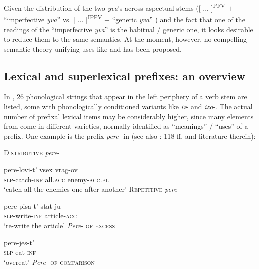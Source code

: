 \documentclass[output=paper,colorlinks,citecolor=brown]{langscibook}
\begin{document}

Given the distribution of the two \textit{yva}’s across aspectual stems ([ ... ]\textsuperscript{PFV} $+$ “imperfective \textit{yva}” vs. [ ... ]\textsuperscript{IPFV} $+$ “generic \textit{yva}” ) and the fact that one of the readings of the  “imperfective \textit{yva}” is the habitual / generic one, it looks desirable to reduce them to the same semantics. 
At the moment, however, no compelling semantic theory unifying uses like  and  has been proposed. 

\subsection{Lexical and superlexical prefixes: an overview}\label{sec:1.3}
\hypertarget{RefHeadingToc164647619}{}
In , 26 phonological strings that appear in the left periphery of a verb stem are listed, some with phonologically conditioned variants like \textit{iz}- and \textit{izo}-. The actual number of prefixal lexical items may be considerably higher, since many elements from  come in different varieties, normally identified as “meanings” / “uses” of a prefix. One example is the prefix \textit{pere-} in  (see also \citealt{Kagan15}: 118 ff. and literature therein):

\ea\label{tat:ex:17}
\ea     \textsc{Distributive} \textit{pere}-

\gll    pere-lovi-t’  vsex  vrag-ov  \\
    \textsc{slp}-catch-\textsc{inf}  all.\textsc{acc}  enemy-\textsc{acc.pl}\\
\glt    ‘catch all the enemies one after another’\label{ex:tatevosov:17a}
\ex    \textsc{Repetitive} \textit{pere}-

\gll    pere-pisa-t’  stat-ju\\
\textsc{slp}-write-\textsc{inf}  article-\textsc{acc}\\
\glt    ‘re-write the article’\label{ex:tatevosov:17b}
\ex    \textit{Pere}- \textsc{of excess}  

\gll pere-jes-t’\\
\textsc{slp}-eat-\textsc{inf} \\
\glt    ‘overeat’\label{ex:tatevosov:17c}
\ex   \textit{Pere}- \textsc{of comparison}
\end{document}
